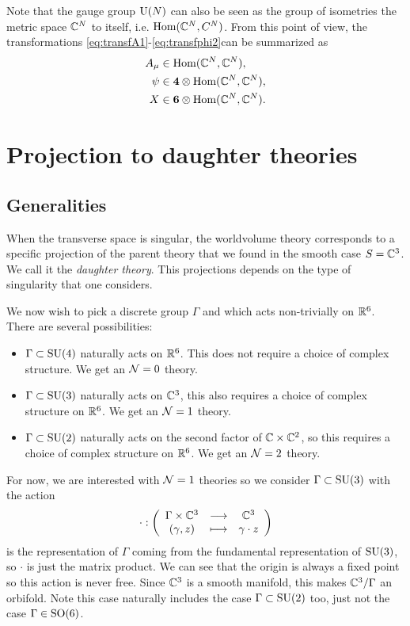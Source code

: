\documentclass[a4paper,10pt]{article}
\begin{document}
        Note that the gauge group $\text{U}(N)$ can also be seen as the group of isometries the metric space $\mathbb{C}^N$ to itself, i.e. $\text{Hom}(\mathbb{C}^N,C^N)$. From this point of view, the transformations \eqref{eq:transfA1}-\eqref{eq:transfphi2}can be summarized as
        \begin{align}
            A_\mu&\in\text{Hom}(\mathbb{C}^N,\mathbb{C}^N),\label{eq:AHom}\\
            \psi&\in\boldsymbol{4}\otimes\text{Hom}(\mathbb{C}^N,\mathbb{C}^N),\label{eq:psiHom}\\
            X&\in\boldsymbol{6}\otimes\text{Hom}(\mathbb{C}^N,\mathbb{C}^N).\label{eq:phiHom}
        \end{align}

\section{Projection to daughter theories}

    \subsection{Generalities}

        When the transverse space is singular, the worldvolume theory corresponds to a specific projection of the parent theory that we found in the smooth case $S=\mathbb{C}^3$. We call it the \emph{daughter theory}. This projections depends on the type of singularity that one considers.

        We now wish to pick a discrete group $\Gamma$ and which acts non-trivially on $\mathbb{R}^6$. There are several possibilities:
        \begin{itemize}
            \item $\Gamma\subset\text{SU}(4)$ naturally acts on $\mathbb{R}^6$. This does not require a choice of complex structure. We get an $\mathcal{N}=0$ theory.
            \item $\Gamma\subset\text{SU}(3)$ naturally acts on $\mathbb{C}^3$, this also requires a choice of complex structure on $\mathbb{R}^6$. We get an $\mathcal{N}=1$ theory.
            \item $\Gamma\subset\text{SU}(2)$ naturally acts on the second factor of $\mathbb{C}\times\mathbb{C}^2$, so this requires a choice of complex structure on $\mathbb{R}^6$. We get an $\mathcal{N}=2$ theory.
        \end{itemize}

        For now, we are interested with $\mathcal{N}=1$ theories so we consider $\Gamma\subset\text{SU}(3)$ with the action
        \begin{equation}
            \cdot:\left(
            \begin{array}{ccc}
                \Gamma\times\mathbb{C}^3 & \longrightarrow & \mathbb{C}^3 \\
                (\gamma,z) & \longmapsto & \gamma\cdot z
            \end{array}
            \right)
        \end{equation}
        is the representation of $\Gamma$ coming from the fundamental representation of $\text{SU}(3)$, so $\cdot$ is just the matrix product. We can see that the origin is always a fixed point so this action is never free. Since $\mathbb{C}^3$ is a smooth manifold, this makes $\mathbb{C}^3/\Gamma$ an orbifold. Note this case naturally includes the case $\Gamma\subset\text{SU}(2)$ too, just not the case $\Gamma\in\text{SO}(6)$.
\end{document}
